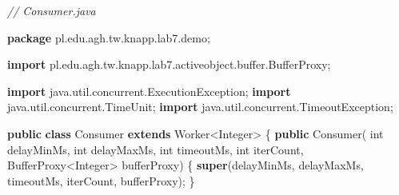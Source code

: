 \documentclass[11pt]{article}
\newenvironment{Shaded}{}{}
\newcommand{\KeywordTok}[1]{\textcolor[rgb]{0.00,0.44,0.13}{\textbf{{#1}}}}
\newcommand{\DataTypeTok}[1]{\textcolor[rgb]{0.56,0.13,0.00}{{#1}}}
\newcommand{\CommentTok}[1]{\textcolor[rgb]{0.38,0.63,0.69}{\textit{{#1}}}}
\newcommand{\FunctionTok}[1]{\textcolor[rgb]{0.02,0.16,0.49}{{#1}}}
\newcommand{\NormalTok}[1]{{#1}}
\newcommand{\ImportTok}[1]{{#1}}
\newcommand{\OperatorTok}[1]{\textcolor[rgb]{0.40,0.40,0.40}{{#1}}}
\newcommand{\BuiltInTok}[1]{{#1}}
\begin{document}
\begin{Shaded}
\begin{Highlighting}[]
\CommentTok{// Consumer.java}

\KeywordTok{package}\ImportTok{ pl}\OperatorTok{.}\ImportTok{edu}\OperatorTok{.}\ImportTok{agh}\OperatorTok{.}\ImportTok{tw}\OperatorTok{.}\ImportTok{knapp}\OperatorTok{.}\ImportTok{lab7}\OperatorTok{.}\ImportTok{demo}\OperatorTok{;}

\KeywordTok{import} \ImportTok{pl}\OperatorTok{.}\ImportTok{edu}\OperatorTok{.}\ImportTok{agh}\OperatorTok{.}\ImportTok{tw}\OperatorTok{.}\ImportTok{knapp}\OperatorTok{.}\ImportTok{lab7}\OperatorTok{.}\ImportTok{activeobject}\OperatorTok{.}\ImportTok{buffer}\OperatorTok{.}\ImportTok{BufferProxy}\OperatorTok{;}

\KeywordTok{import} \ImportTok{java}\OperatorTok{.}\ImportTok{util}\OperatorTok{.}\ImportTok{concurrent}\OperatorTok{.}\ImportTok{ExecutionException}\OperatorTok{;}
\KeywordTok{import} \ImportTok{java}\OperatorTok{.}\ImportTok{util}\OperatorTok{.}\ImportTok{concurrent}\OperatorTok{.}\ImportTok{TimeUnit}\OperatorTok{;}
\KeywordTok{import} \ImportTok{java}\OperatorTok{.}\ImportTok{util}\OperatorTok{.}\ImportTok{concurrent}\OperatorTok{.}\ImportTok{TimeoutException}\OperatorTok{;}

\KeywordTok{public} \KeywordTok{class}\NormalTok{ Consumer }\KeywordTok{extends}\NormalTok{ Worker}\OperatorTok{\textless{}}\BuiltInTok{Integer}\OperatorTok{\textgreater{}} \OperatorTok{\{}
    \KeywordTok{public} \FunctionTok{Consumer}\OperatorTok{(}
        \DataTypeTok{int}\NormalTok{ delayMinMs}\OperatorTok{,} \DataTypeTok{int}\NormalTok{ delayMaxMs}\OperatorTok{,}
        \DataTypeTok{int}\NormalTok{ timeoutMs}\OperatorTok{,} \DataTypeTok{int}\NormalTok{ iterCount}\OperatorTok{,}
\NormalTok{        BufferProxy}\OperatorTok{\textless{}}\BuiltInTok{Integer}\OperatorTok{\textgreater{}}\NormalTok{ bufferProxy}\OperatorTok{)}
    \OperatorTok{\{}
        \KeywordTok{super}\OperatorTok{(}\NormalTok{delayMinMs}\OperatorTok{,}\NormalTok{ delayMaxMs}\OperatorTok{,}\NormalTok{ timeoutMs}\OperatorTok{,}\NormalTok{ iterCount}\OperatorTok{,}\NormalTok{ bufferProxy}\OperatorTok{);}
    \OperatorTok{\}}


\end{Highlighting}
\end{Shaded}
\end{document}
